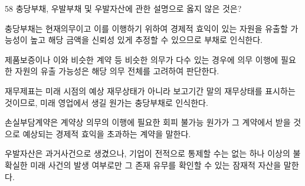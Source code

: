 \begin{question}{58}
충당부채, 우발부채 및 우발자산에 관한 설명으로 옳지 않은 것은?
\begin{choices}
  \item 충당부채는 현재의무이고 이를 이행하기 위하여 경제적 효익이 있는 자원을 유출할 가능성이 높고 해당 금액을 신뢰성 있게 추정할 수 있으므로 부채로 인식한다.
  \item 제품보증이나 이와 비슷한 계약 등 비슷한 의무가 다수 있는 경우에 의무 이행에 필요한 자원의 유출 가능성은 해당 의무 전체를 고려하여 판단한다.
  \item 재무제표는 미래 시점의 예상 재무상태가 아니라 보고기간 말의 재무상태를 표시하는 것이므로, 미래 영업에서 생길 원가는 충당부채로 인식한다.
  \item 손실부담계약은 계약상 의무의 이행에 필요한 회피 불가능 원가가 그 계약에서 받을 것으로 예상되는 경제적 효익을 초과하는 계약을 말한다.
  \item 우발자산은 과거사건으로 생겼으나, 기업이 전적으로 통제할 수는 없는 하나 이상의 불확실한 미래 사건의 발생 여부로만 그 존재 유무를 확인할 수 있는 잠재적 자산을 말한다.
\end{choices}
\end{question}
